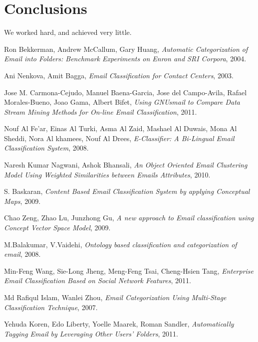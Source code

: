 \documentclass[12pt]{article}
\begin{document}

\section{Conclusions}\label{conclusions}
We worked hard, and achieved very little.


\begin{thebibliography}{99}
  Ron Bekkerman,
  Andrew McCallum,
  Gary Huang,
  \emph{Automatic Categorization of Email into Folders: Benchmark Experiments on Enron and SRI Corpora},
  2004.

  Ani Nenkova,
  Amit Bagga,
  \emph{Email Classification for Contact Centers},
  2003.

  Jose M. Carmona-Cejudo,
  Manuel Baena-Garcia,
  Jose del Campo-Avila,
  Rafael Morales-Bueno,
  Joao Gama,
  Albert Bifet,
  \emph{Using GNUsmail to Compare Data Stream Mining Methods for On-line Email Classification},
  2011.

  Nouf Al Fe'ar,
  Einas Al Turki,
  Asma Al Zaid,
  Mashael Al Duwais,
  Mona Al Sheddi,
  Nora Al khamees,
  Nouf Al Drees,
  \emph{E-Classifier: A Bi-Lingual Email Classification System},
  2008.

  Naresh Kumar Nagwani,
  Ashok Bhansali,
  \emph{An Object Oriented Email Clustering Model Using Weighted Similarities between Emails Attributes},
  2010.


  S. Baskaran,
  \emph{Content Based Email Classification System by applying Conceptual Maps},
  2009.

  Chao Zeng,
  Zhao Lu,
  Junzhong Gu,
  \emph{A new approach to Email classification using Concept Vector Space Model},
  2009.

  M.Balakumar,
  V.Vaidehi,
  \emph{Ontology based classification and categorization of email},
  2008.

  Min-Feng Wang,
  Sie-Long Jheng,
  Meng-Feng Tsai,
  Cheng-Hsien Tang,
  \emph{Enterprise Email Classification Based on Social Network Features},
  2011.

  Md Rafiqul Islam,
  Wanlei Zhou,
  \emph{Email Categorization Using Multi-Stage Classification Technique},
  2007.

  Yehuda Koren,
  Edo Liberty,
  Yoelle Maarek,
  Roman Sandler,
  \emph{Automatically Tagging Email by Leveraging Other Users' Folders},
  2011.


\end{thebibliography}
\end{document}
